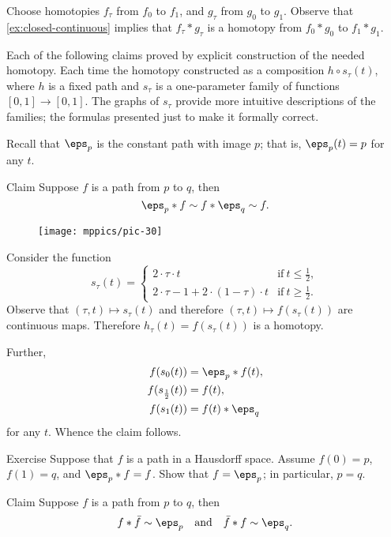 Choose homotopies $f_\tau$ from $f_0$ to $f_1$, and $g_\tau$ from $g_0$ to $g_1$.
Observe that \ref{ex:closed-continuous} implies that
$f_\tau*g_\tau$ is a homotopy from $f_0*g_0$ to $f_1*g_1$.
\qeds

Each of the following claims proved by explicit construction of the needed homotopy.
Each time the homotopy constructed as a composition $h\circ s_\tau(t)$, where $h$ is a fixed path and  $s_\tau$ is a one-parameter family of functions $[0,1]\to [0,1]$.
The graphs of $s_\tau$ provide more intuitive descriptions of the families;
the formulas presented just to make it formally correct.

Recall that $\eps_p$ is the constant path with image $p$;
that is, $\eps_p(t)=p$ for any $t$.

\begin{thm}{Claim}\label{clm:neutral}
Suppose $f$ is a path from $p$ to $q$, then
\[\eps_p*f\sim f*\eps_q\sim  f.\]
\end{thm}

\begin{wrapfigure}{r}{30mm}
\centering
\vskip-5mm
\texttt{[image: mppics/pic-30]}
\end{wrapfigure}

Consider the function
\[s_\tau(t)=
\begin{cases}
2\cdot \tau \cdot t&\text{if}\ t\le \tfrac12,
\\
2\cdot\tau-1+2\cdot (1-\tau) \cdot t&\text{if}\ t\ge \tfrac12.
\end{cases}
\]
Observe that $(\tau,t)\mapsto s_\tau(t)$ and therefore $(\tau,t)\mapsto f(s_\tau(t))$ are continuous maps.
Therefore $h_\tau(t)=f(s_\tau(t))$ is a homotopy.

Further,
\begin{align*}
f(s_0(t))&=\eps_p*f(t),
\\
f(s_{\frac12}(t))&=f(t),
\\
f(s_1(t))&=f(t)*\eps_q
\end{align*}
for any $t$.
Whence the claim follows.
\qeds

\begin{thm}{Exercise}\label{ex:neutral}
Suppose that $f$ is a path in a Hausdorff space.
Assume $f(0)=p$, $f(1)=q$, and $\eps_p*f= f$.
Show that $f=\eps_p$; in particular, $p=q$.
\end{thm}

\begin{thm}{Claim}\label{clm:f-bar-f}
Suppose $f$ is a path from $p$ to $q$, then
\[f*\bar f\sim \eps_p
\quad\text{and}\quad
\bar f*f\sim \eps_q.\]
\end{thm}

